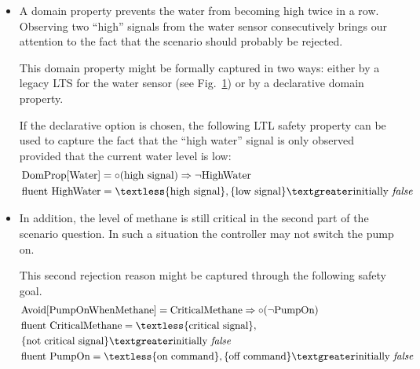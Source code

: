 \begin{itemize}
\item A domain property prevents the water from becoming high twice in a row. Observing two ``high'' signals from the water sensor consecutively brings our attention to the fact that the scenario should probably be rejected.

This domain property might be formally captured in two ways: either by a legacy LTS for the water sensor (see Fig.~\ref{image:minepump-water-sensor-lts}) or by a declarative domain property.
\begin{figure}[H]
\centering
{}
\label{image:minepump-water-sensor-lts}
\end{figure}

If the declarative option is chosen, the following LTL safety property can be used to capture the fact that the ``high water'' signal is only observed provided that the current water level is low:
\begin{align*}
&\mbox{DomProp[Water]} = \circ(\mbox{high signal}) \Rightarrow \neg \mbox{HighWater}\\
&\mbox{fluent HighWater} = \textless \{\mbox{high signal}\}, \{\mbox{low signal}\} \textgreater \mbox{initially \emph{false}}
\end{align*}

\item In addition, the level of methane is still critical in the second part of the scenario question. In such a situation the controller may not switch the pump on.

This second rejection reason might be captured through the following safety goal.
\begin{align*}
&\mbox{Avoid[PumpOnWhenMethane]} = \mbox{CriticalMethane} \Rightarrow \circ(\neg \mbox{PumpOn}) \\
&\mbox{fluent CriticalMethane} = \textless \{\mbox{critical signal}\}, \\ 
&\{\mbox{not critical signal}\} \textgreater\mbox{initially \emph{false}} \\
&\mbox{fluent PumpOn} = \textless \{\mbox{on command}\}, \{\mbox{off command}\} \textgreater \mbox{initially \emph{false}}
\end{align*}

\end{itemize}

